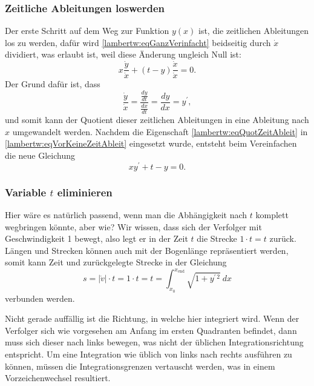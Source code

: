 \subsubsection{Zeitliche Ableitungen loswerden
	\label{lambertw:subsubsection:ZeitAbleit}}
Der erste Schritt auf dem Weg zur Funktion \(y(x)\) ist, die zeitlichen Ableitungen los zu werden, dafür wird \eqref{lambertw:eqGanzVerinfacht} beidseitig durch \(\dot{x}\) dividiert, was erlaubt ist, weil diese Änderung ungleich Null ist:
\begin{equation}
	x \frac{\dot{y}}{\dot{x}} + (t-y) \frac{\dot{x}}{\dot{x}}
	= 0.
	\label{lambertw:eqVorKeineZeitAbleit}
\end{equation}
Der Grund dafür ist, dass
\begin{equation}
	\frac{\displaystyle\dot{y}}{\displaystyle\dot{x}} 
	= \frac{\displaystyle\frac{dy}{dt}}{\displaystyle\frac{dx}{dt}}  
	= \frac{dy}{dx}
	= y^{\prime},
	\label{lambertw:eqQuotZeitAbleit}
\end{equation}
und somit kann der Quotient dieser zeitlichen Ableitungen in eine Ableitung nach \(x\) umgewandelt werden.
Nachdem die Eigenschaft \eqref{lambertw:eqQuotZeitAbleit} in \eqref{lambertw:eqVorKeineZeitAbleit} eingesetzt wurde, entsteht beim Vereinfachen die neue Gleichung
\begin{equation}
	x y^{\prime} + t - y
	= 0.
	\label{lambertw:DGLmitT}
\end{equation}

\subsubsection{Variable \(t\) eliminieren
	\label{lambertw:subsubsection:VarTelimin}}
Hier wäre es natürlich passend, wenn man die Abhängigkeit nach \(t\) komplett wegbringen könnte, aber wie?
Wir wissen, dass sich der Verfolger mit Geschwindigkeit 1 bewegt, also legt er in der Zeit \(t\) die Strecke \(1\cdot t = t\) zurück. Längen und Strecken können auch mit der Bogenlänge repräsentiert werden, somit kann Zeit und zurückgelegte Strecke in der Gleichung  
\begin{equation}
	s
	= 
	|\dot{v}| \cdot t
	=
	1 \cdot t
	=
	t
	=
	\int_{\displaystyle x_0}^{\displaystyle x_{\text{end}}}\sqrt{1+y^{\prime\, 2}} \: dx
	\label{lambertw:eqZuBogenlaenge}
\end{equation}
verbunden werden.

Nicht gerade auffällig ist die Richtung, in welche hier integriert wird. Wenn der Verfolger sich wie vorgesehen am Anfang im ersten Quadranten befindet, dann muss sich dieser nach links bewegen, was nicht der üblichen Integrationsrichtung entspricht. Um eine Integration wie üblich von links nach rechts ausführen zu können, müssen die Integrationsgrenzen vertauscht werden, was in einem Vorzeichenwechsel resultiert. 

